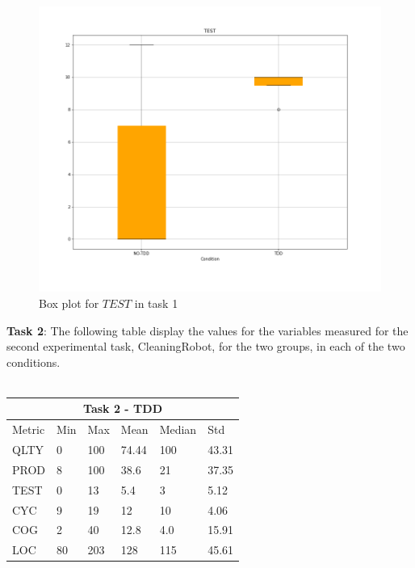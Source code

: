 \begin{figure}[H]
    \centering
    \includegraphics[width=\textwidth]{figures/box plots/task1/p1_condition_test_bp.png}
    \caption{Box plot for $TEST$ in task 1}
    \label{fig: Box plot for TEST in task 1}
\end{figure}



\noindent \textbf{Task 2}: The following table display the values for the variables measured for the second experimental task, CleaningRobot, for the two groups, in each of the two conditions.
\\ \  \\
\noindent
\begin{tabular}{ |p{2cm}||p{1.6cm}|p{1.6cm}|p{1.6cm}|p{1.6cm}|p{1.6cm}|}
    \hline
        \multicolumn{6}{|c|}{Task 2 - TDD} \\
    \hline
        Metric & Min & Max & Mean & Median & Std\\
    \hline
        QLTY & 0 & 100 & 74.44 & 100 & 43.31 \\
        PROD & 8 & 100 & 38.6 & 21 & 37.35 \\
        TEST & 0 & 13 & 5.4 & 3 & 5.12 \\
        CYC & 9 & 19 & 12 & 10 & 4.06 \\
        COG & 2 & 40 & 12.8 & 4.0 & 15.91 \\
        LOC & 80 & 203 & 128 & 115 & 45.61 \\
    \hline
\end{tabular}



